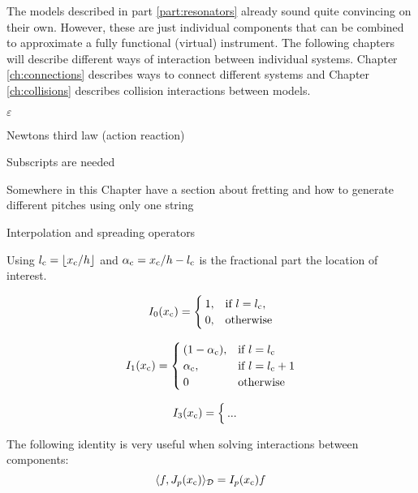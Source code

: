 The models described in part \ref{part:resonators} already sound quite convincing on their own. However, these are just individual components that can be combined to approximate a fully functional (virtual) instrument. The following chapters will describe different ways of interaction between individual systems. Chapter \ref{ch:connections} describes ways to connect different systems and Chapter \ref{ch:collisions} describes collision interactions between models. 

$\varepsilon$

Newtons third law (action reaction)

Subscripts are needed

Somewhere in this Chapter have a section about fretting and how to generate different pitches using only one string

Interpolation and spreading operators

Using $l_\ctxt = \floor[x_\ctxt / h]$ and $\alpha_{\text{c}} = x_{\text{c}} / h - l_{\text{c}}$ is the fractional part the location of interest.
 
\begin{equation}
    I_0(x_{\text{c}}) = \begin{cases}
        1, & \text{if}\ l = l_{\text{c}},\\
        0, & \text{otherwise}
    \end{cases}
\end{equation}

\begin{equation}
    I_1(x_{\text{c}}) = \begin{cases}
        (1-\alpha_{\text{c}}), & \text{if}\ l = l_{\text{c}}\\
        \alpha_{\text{c}} , & \text{if}\ l = l_{\text{c}} + 1\\
        0 & \text{otherwise}
    \end{cases}
\end{equation}

\begin{equation}
    I_3(x_{\text{c}}) = \begin{cases}
        ...
    \end{cases}
\end{equation}

The following identity is very useful when solving interactions between components:
\begin{equation}\label{eq:identityIJ}
    \langle f, J_p(x_{\text{c}}) \rangle_{\mathcal{D}} = I_p(x_{\text{c}}) f
\end{equation}